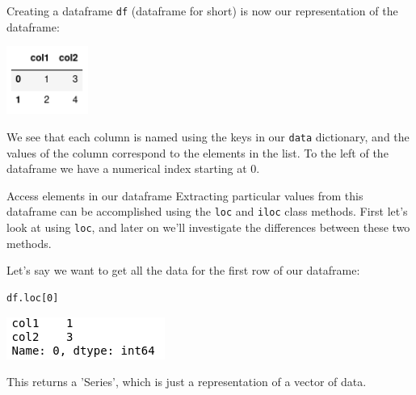 \documentclass[10pt]{beamer}
\begin{document}
\begin{frame}[label={sec:orga03eed7},fragile]{Creating a dataframe}
 \texttt{df} (dataframe for short) is now our representation of the dataframe:

\begin{center}
\includegraphics[width=0.2\textwidth]{images/simple_dataframe.png}
\end{center}

We see that each column is named using the keys in our \texttt{data} dictionary, and the
values of the column correspond to the elements in the list. To the left of the
dataframe we have a numerical index starting at 0.
\end{frame}

\begin{frame}[label={sec:orgf0a6f4e},fragile]{Access elements in our dataframe}
 Extracting particular values from this dataframe can be accomplished using the
\texttt{loc} and \texttt{iloc} class methods. First let's look at using \texttt{loc}, and later on we'll
investigate the differences between these two methods.

Let's say we want to get all the data for the first row of our dataframe:

\begin{verbatim}
df.loc[0]
\end{verbatim}

\begin{center}
\includegraphics[scale=0.5]{images/series.png}
\end{center}

This returns a 'Series', which is just a representation of a vector of data.
\end{frame}
\end{document}
